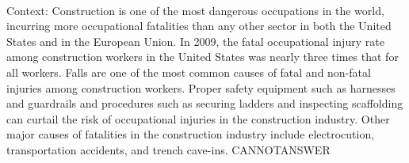 \documentclass[11pt,a4paper, onecolumn]{article}
\begin{document}
\\ Context: Construction is one of the most dangerous occupations in the world, incurring more occupational fatalities than any other sector in both the United States and in the European Union. In 2009, the fatal occupational injury rate among construction workers in the United States was nearly three times that for all workers. Falls are one of the most common causes of fatal and non-fatal injuries among construction workers. Proper safety equipment such as harnesses and guardrails and procedures such as securing ladders and inspecting scaffolding can curtail the risk of occupational injuries in the construction industry. Other major causes of fatalities in the construction industry include electrocution, transportation accidents, and trench cave-ins. CANNOTANSWER
\end{document}
